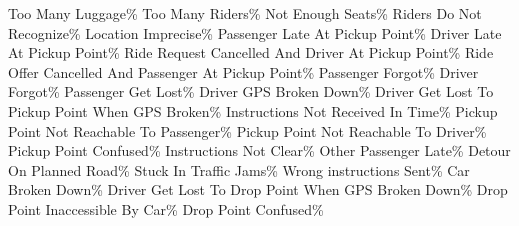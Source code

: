 \bTR\bTD Too Many Luggage\eTD{}\% \eTD
\bTD Too Many Riders\eTD{}\% \eTD\eTR
\bTR\bTD Not Enough Seats\eTD{}\% \eTD
\bTD Riders Do Not Recognize\eTD{}\% \eTD\eTR
\bTR\bTD Location Imprecise\eTD{}\% \eTD
\bTD Passenger Late At Pickup Point\eTD{}\% \eTD\eTR
\bTR\bTD Driver Late At Pickup Point\eTD{}\% \eTD
\bTD Ride Request Cancelled And Driver At Pickup Point\eTD{}\% \eTD\eTR
\bTR\bTD Ride Offer Cancelled And Passenger At Pickup Point\eTD{}\% \eTD
\bTD Passenger Forgot\eTD{}\% \eTD\eTR
\bTR\bTD Driver Forgot\eTD{}\% \eTD
\bTD Passenger Get Lost\eTD{}\% \eTD\eTR
\bTR\bTD Driver GPS Broken Down\eTD{}\% \eTD
\bTD Driver Get Lost To Pickup Point When GPS Broken\eTD{}\% \eTD\eTR
\bTR\bTD Instructions Not Received In Time\eTD{}\% \eTD
\bTD Pickup Point Not Reachable To Passenger\eTD{}\% \eTD\eTR
\bTR\bTD Pickup Point Not Reachable To Driver\eTD{}\% \eTD
\bTD Pickup Point Confused\eTD{}\% \eTD\eTR
\bTR\bTD Instructions Not Clear\eTD{}\% \eTD
\bTD Other Passenger Late\eTD{}\% \eTD\eTR
\bTR\bTD Detour On Planned Road\eTD{}\% \eTD
\bTD Stuck In Traffic Jams\eTD{}\% \eTD\eTR
\bTR\bTD Wrong instructions Sent\eTD{}\% \eTD
\bTD Car Broken Down\eTD{}\% \eTD\eTR
\bTR\bTD Driver Get Lost To Drop Point When GPS Broken Down\eTD{}\% \eTD
\bTD Drop Point Inaccessible By Car\eTD{}\% \eTD\eTR
\bTR\bTD Drop Point Confused\eTD{}\% \eTD
 \bTD\eTD\bTD\eTD\eTR

\eTABLE